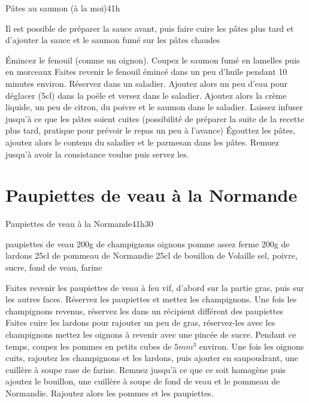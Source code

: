 {\begin{recette}{Pâtes au saumon (à la moi)}{4}{1h}{}
\begin{remarque}
Il est possible de préparer la sauce avant, puis faire cuire les pâtes plus tard et d'ajouter la sauce et le saumon fumé sur les pâtes chaudes
\end{remarque}


\begin{preparation}
\etape Émincez le fenouil (comme un oignon). Coupez le saumon fumé en lamelles puis en morceaux
\etape Faites revenir le fenouil émincé dans un peu d'huile pendant 10 minutes environ.
\etape Réservez dans un saladier. 
\etape Ajoutez alors un peu d'eau pour déglacer (5cl) dans la poële et versez dans le saladier. 
\etape Ajoutez alors la crème liquide, un peu de citron, du poivre et le saumon dans le saladier. 
\etape Laissez infuser jusqu'à ce que les pâtes soient cuites (possibilité de préparer la suite de la recette plus tard, pratique pour prévoir le repas un peu à l'avance)
\etape Égouttez les pâtes, ajoutez alors le contenu du saladier et le parmesan dans les pâtes. 
\etape Remuez jusqu'à avoir la consistance voulue puis servez les.
\end{preparation}
\end{recette}


\section{Paupiettes de veau à la Normande}
\begin{recette}{Paupiettes de veau à la Normande}{4}{1h30}{}
\begin{ingredients}
 paupiettes de veau
\ingredient 200g de champignons
 oignons
 pomme assez ferme
\ingredient 200g de lardons
\ingredient 25cl de pommeau de Normandie
\ingredient 25cl de bouillon de Volaille
\ingredient sel, poivre, sucre, fond de veau, farine
\end{ingredients}

\begin{preparation}
\etape Faites revenir les paupiettes de veau à feu vif, d'abord sur la partie gras, puis sur les autres faces. 
\etape Réservez les paupiettes et mettez les champignons.
\etape Une fois les champignons revenus, réservez les dans un récipient différent des paupiettes
\etape Faites cuire les lardons pour rajouter un peu de gras, réservez-les avec les champignons
\etape mettez les oignons à revenir avec une pincée de sucre. 
\etape Pendant ce temps, coupez les pommes en petits cubes de $5\unit{mm^3}$ environ. 
\etape Une fois les oignons cuits, rajoutez les champignons et les lardons, puis ajouter en saupoudrant, une cuillère à soupe 
rase de farine. Remuez jusqu'à ce que ce soit homogène puis ajoutez le bouillon, une cuillère à soupe de fond de veau et le 
pommeau de Normandie. 
\etape Rajoutez alors les pommes et les paupiettes.
\end{preparation}


\end{recette}}
